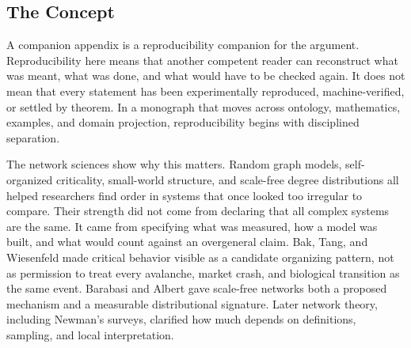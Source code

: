 \documentclass[11pt,a4paper,openany]{book}
\begin{document}
\subsection{The Concept}
A companion appendix is a reproducibility companion for the argument. Reproducibility here means that another competent reader can reconstruct what was meant, what was done, and what would have to be checked again. It does not mean that every statement has been experimentally reproduced, machine-verified, or settled by theorem. In a monograph that moves across ontology, mathematics, examples, and domain projection, reproducibility begins with disciplined separation. \cite{raf_networks,bak_soc}\par
The network sciences show why this matters. Random graph models, self-organized criticality, small-world structure, and scale-free degree distributions all helped researchers find order in systems that once looked too irregular to compare. Their strength did not come from declaring that all complex systems are the same. It came from specifying what was measured, how a model was built, and what would count against an overgeneral claim. Bak, Tang, and Wiesenfeld made critical behavior visible as a candidate organizing pattern, not as permission to treat every avalanche, market crash, and biological transition as the same event. Barabasi and Albert gave scale-free networks both a proposed mechanism and a measurable distributional signature. Later network theory, including Newman's surveys, clarified how much depends on definitions, sampling, and local interpretation.\par
\end{document}
